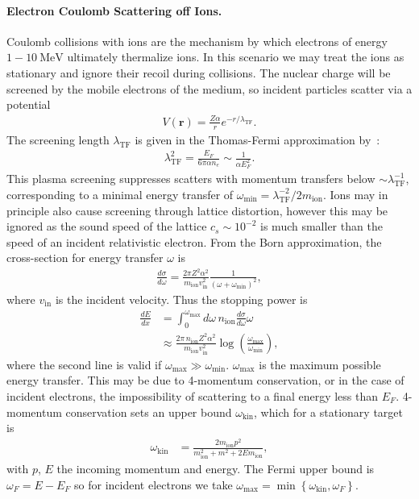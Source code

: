\documentclass[preprintnumbers,amsmath,amssymb,prd,superscriptaddress]{revtex4}
\newcommand{\MeV}{\text{MeV}}
\newcommand{\x}[1]{\ensuremath{\text{#1}}} %
\newcommand{\kin}{\text{kin}}
\newcommand{\xmin}{\text{min}}
\newcommand{\xmax}{\text{max}}
\newcommand{\ion}{\text{ion}}
\newcommand{\TF}{\text{TF}}
\begin{document}
\begin{appendices}
\paragraph{Electron Coulomb Scattering off Ions.}
\label{sec:coulomb_ion}
Coulomb collisions with ions are the mechanism by which electrons of energy $1- 10~\MeV$ ultimately thermalize ions.
In this scenario we may treat the ions as stationary and ignore their recoil during collisions.
The nuclear charge will be screened by the mobile electrons of the medium, so incident particles scatter via a potential
\begin{align}
  \label{eq:ScreenedPotential}
V(\textbf{r}) = \frac{Z \alpha}{r} e^{-r/\lambda_\TF}.
\end{align}
The screening length $\lambda_\TF$ is given in the Thomas-Fermi approximation by~\cite{Teukolsky}:
\begin{align}
\label{eq:TF}
    \lambda_\TF^{2} = \frac{E_F}{6 \pi \alpha n_e}
    \sim \frac{1}{\alpha E_F^2}.
\end{align}
This plasma screening suppresses scatters with momentum transfers below $\sim \lambda_\TF^{-1}$, corresponding to a minimal energy transfer of $\omega_\xmin = \lambda_\TF^{-2} / 2 m_\ion$.
Ions may in principle also cause screening through lattice distortion, however this may be ignored as the sound speed of the lattice $c_s \sim 10^{-2}$ is much smaller than the speed of an incident relativistic electron.
From the Born approximation, the cross-section for energy transfer $\omega$ is
\begin{align}
\label{eq:CoulombOffIonsCrossSection}
  \frac{d \sigma}{d \omega} =
  \frac{2 \pi Z^2 \alpha^2}{m_\ion v_\x{in}^2}
  \frac{1}{(\omega + \omega_\xmin)^2},
\end{align}
where $v_\x{in}$ is the incident velocity.
Thus the stopping power is
\begin{align}
  \frac{dE}{d x} &= \int_{0}^{\omega_\xmax} d \omega \, n_\ion
  \frac{d \sigma}{d \omega} \omega \nonumber \\
  \label{eq:StoppingPowerOffIons}
   &\approx \frac{2 \pi\, n_\ion Z^2 \alpha^2 }{m_\ion v_\x{in}^2}
   \log\left( \frac{\omega_\xmax}{\omega_\xmin} \right),
\end{align}
where the second line is valid if $\omega_\xmax \gg \omega_\xmin$.
$\omega_\xmax$ is the maximum possible energy transfer.
This may be due to 4-momentum conservation, or in the case of incident electrons, the impossibility of scattering to a final energy less than $E_F$.
4-momentum conservation sets an upper bound $\omega_\kin$, which for a stationary target is
\begin{align}
  \omega_\kin &= \frac{2 m_\ion p^2}{m_\ion^2 + m^2 + 2E m_\ion},
\end{align}
with $p$, $E$ the incoming momentum and energy.
The Fermi upper bound is $\omega_F = E - E_F$ so for incident electrons we take $\omega_\xmax = \min\left\{\omega_\kin, \omega_F\right\}$.


\end{appendices}
\end{document}
